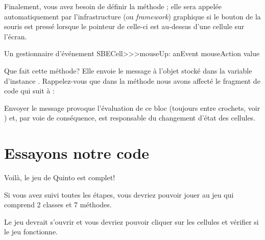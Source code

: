 \documentclass[a4paper,10pt,twoside]{book}
\begin{document}

Finalement, vous avez besoin de définir la méthode ; elle
sera appelée automatiquement par l'infrastructure (ou \emph{framework})
graphique si le bouton de la souris est pressé lorsque le pointeur de
celle-ci est au-dessus d'une cellule sur l'écran.

\begin{method}[sbecellmouseup]{Un gestionnaire d'événement}
SBECell>>>mouseUp: anEvent
   mouseAction value
\end{method}


Que fait cette méthode? Elle envoie le message  à l'objet
stocké dans la variable d'instance . 
Rappelez-vous que dans la méthode 
nous avons affecté le fragment de code qui suit à :


\noindent
Envoyer le message  provoque l'évaluation de ce bloc
(toujours entre crochets, voir ) et, par voie de
conséquence, est responsable du changement d'état des cellules.

\section{Essayons notre code}

Voil\`a, le jeu de Quinto est complet!

Si vous avez suivi toutes les étapes, vous devriez pouvoir jouer au jeu qui comprend 2 classes et 7 méthodes.


Le jeu devrait s'ouvrir et vous devriez pouvoir cliquer sur les cellules et vérifier si le jeu fonctionne.
\end{document}
